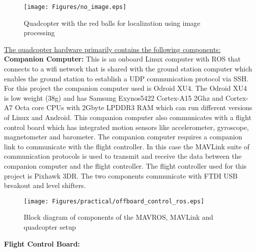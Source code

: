 \documentclass{article}
\begin{document}
\begin{figure}[H]
\centering
\texttt{[image: Figures/no\_image.eps]}
\caption{Quadcopter with the red balls for localization using image processing}
\label{quad_red_balls}
\end{figure}


\underline{The quadcopter hardware primarily contains the following components:}\\
\textbf{Companion Computer:} This is an onboard Linux computer with ROS that connects to a wifi network that is shared with the ground station computer which enables the ground station to establish a UDP communication protocol via SSH. For this project the companion computer used is Odroid XU4. The Odroid XU4 is low weight (38g) and has Samsung Exynos5422 Cortex-A15 2Ghz and Cortex-A7 Octa core CPUs with 2Gbyte LPDDR3 RAM which can run different versions of Linux and Android. This companion computer also communicates with a flight control board which has integrated motion sensors like accelerometer, gyroscope, magnetometer and barometer. The companion computer requires a companion link to communicate with the flight controller. In this case the MAVLink suite of communication protocols is used to transmit and receive the data between the companion computer and the flight controller. The flight controller used for this project is Pixhawk 3DR. The two components communicate with FTDI USB breakout and level shifters. 
\begin{figure}[H]
\centering
\texttt{[image: Figures/practical/offboard\_control\_ros.eps]}
\caption{Block diagram of components of the MAVROS, MAVLink and quadcopter setup}
\label{offboard_control_ros_EPS}
\end{figure}
\textbf{Flight Control Board:} 
\end{document}
